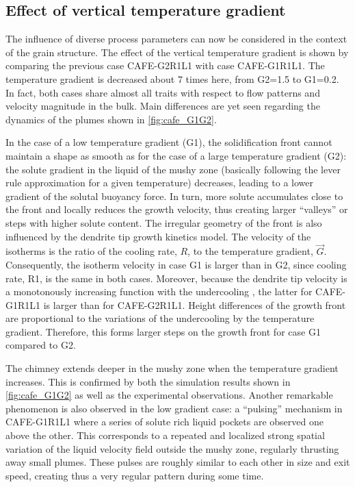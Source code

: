\subsection{Effect of vertical temperature gradient}

The influence of diverse process parameters can now be considered in the context of the grain structure. 
The effect of the vertical temperature gradient is shown by comparing the previous case CAFE-G2R1L1 
with case CAFE-G1R1L1. The temperature gradient is decreased about 7 times here, from G2=\SI{1.5}{\ugradT}
to G1=\SI{0.2}{\ugradT}. In fact, both cases share almost all traits with respect to flow patterns and velocity
magnitude in the bulk. Main differences are yet seen regarding the dynamics of the plumes shown in 
\cref{fig:cafe_G1G2}. 

In the case of a low temperature gradient (G1), the solidification front cannot maintain a 
shape as smooth as for the case of a large temperature gradient (G2): the solute gradient in the 
liquid of the mushy zone (basically following the lever rule approximation for a given temperature) 
decreases, leading to a lower gradient of the solutal buoyancy force. In turn, more solute accumulates 
close to the front and locally reduces the growth velocity, thus creating larger “valleys” or steps 
with higher solute content. The irregular geometry of the front is also influenced by the dendrite tip 
growth kinetics model. The velocity of the isotherms is the ratio of the cooling rate, $R$, to the 
temperature gradient, $\vec{G}$. Consequently, the isotherm velocity in case G1 is larger than in G2, since 
cooling rate, R1, is the same in both cases. Moreover, because the dendrite tip velocity is a monotonously 
increasing function with the undercooling \citep{gandin_boundary_2003}, the latter for CAFE-G1R1L1 is larger 
than for CAFE-G2R1L1. Height differences of the growth front are proportional to the variations of the 
undercooling by the temperature gradient. Therefore, this forms larger steps on the growth front for case 
G1 compared to G2. 

The chimney extends deeper in the mushy zone when the temperature gradient increases. 
This is confirmed by both the simulation results shown in \cref{fig:cafe_G1G2} as well as the experimental observations. 
Another remarkable phenomenon is also observed in the low gradient case: a “pulsing” mechanism in CAFE-G1R1L1 
where a series of solute rich liquid pockets are observed one above the other. This corresponds to a repeated
and localized strong spatial variation of the liquid velocity field outside the mushy zone, regularly thrusting 
away small plumes. These pulses are roughly similar to each other in size and exit speed, creating thus a very 
regular pattern during some time. 

